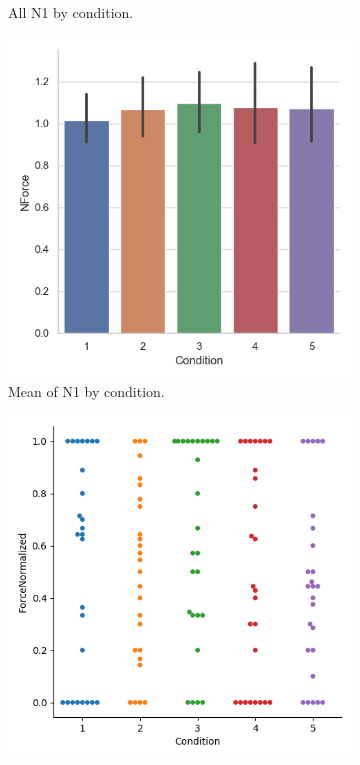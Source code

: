 \begin{figure}[H]
\begin{subfigure}[b]{0.4\textwidth}
         \caption{All N1 by condition. }
         \label{fig:allN1NCond}
     \end{subfigure}
     \hspace*{\fill}
     \begin{subfigure}[b]{0.4\textwidth}
         \centering
         \includegraphics[width=\textwidth]{Files/Plots/forceNforce_mean_by_condition.png}
         \caption{Mean of N1  by condition. }
         \label{fig:meanN1Cond}
     \end{subfigure} 
     \hspace*{\fill}
         \begin{subfigure}[b]{0.4\textwidth}
         \centering
         \includegraphics[width=\textwidth]{Files/Plots/forceNormalized_by_cond_swarm.png}

\end{subfigure}
\end{figure}
